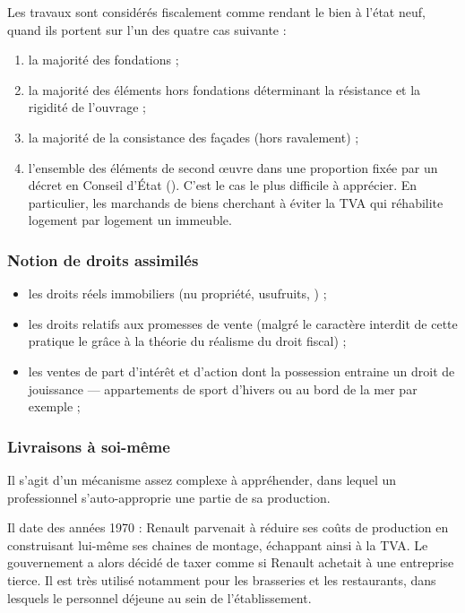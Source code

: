 			Les travaux sont considérés fiscalement comme rendant le bien à l'état neuf, quand ils portent sur l'un des quatre cas suivante :
			\begin{enumerate}
				\item la majorité des fondations ;
				\item la majorité des éléments hors fondations déterminant la résistance et la rigidité de l'ouvrage ;
				\item la majorité de la consistance des façades (hors ravalement) ;
				\item l'ensemble des éléments de second œuvre dans une proportion fixée par un décret en Conseil d'État (). C'est le cas le plus difficile à apprécier. En particulier, les marchands de biens cherchant à éviter la TVA qui réhabilite logement par logement un immeuble.
			\end{enumerate}
			
		\subsubsection{Notion de droits assimilés}
			
			\begin{itemize}
				\item les droits réels immobiliers (nu propriété, usufruits, \etc) ;
				\item les droits relatifs aux promesses de vente (malgré le caractère interdit de cette pratique le grâce à la théorie du réalisme du droit fiscal) ;
				\item les ventes de part d'intérêt et d'action dont la possession entraine un droit de jouissance --- appartements de sport d'hivers ou au bord de la mer par exemple ;
			\end{itemize}
		
		\subsubsection{Livraisons à soi-même}
			
			Il s'agit d'un mécanisme assez complexe à appréhender, dans lequel un professionnel s'auto-approprie une partie de sa production.
			
			Il date des années 1970 : Renault parvenait à réduire ses coûts de production en construisant lui-même ses chaines de montage, échappant ainsi à la TVA. Le gouvernement a alors décidé de taxer comme si Renault achetait à une entreprise tierce. Il est très utilisé notamment pour les brasseries et les restaurants, dans lesquels le personnel déjeune au sein de l'établissement.
			

